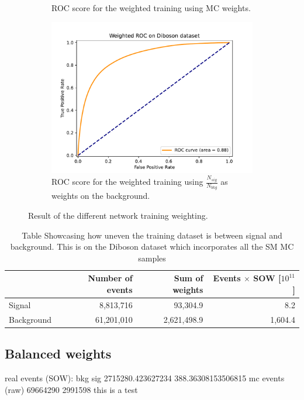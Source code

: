 \documentclass[14pt, a4paper]{book}
\begin{document}
\begin{figure}[!ht]
\begin{subfigure}[b]{0.49\textwidth}
        \caption{ROC score for the weighted training using MC weights.}\label{fig:DibosonROCMC}
     \end{subfigure}
     \begin{subfigure}[b]{0.49\textwidth}
        \centering
        \includegraphics[width=1\textwidth]{ROC_w.pdf}
        \caption{ROC score for the weighted training using $\frac{N_{sig}}{N_{bkg}}$ as weights on the background.}\label{fig:DibosonROCW}
     \end{subfigure}
	\caption{Result of the different network training weighting.}\label{fig:DibosonROC}
\end{figure}
\begin{table}[!h]
    \centering
    \begin{tabular}{l|r|r|r}\midrule\midrule
                    & Number of events & Sum of weights & Events $\times$ SOW [$10^{11}$]\\\midrule
         Signal     & 8,813,716        & 93,304.9       & 8.2\\
         Background & 61,201,010       & 2,621,498.9    & 1,604.4 \\ \midrule\midrule
    \end{tabular}
    \caption[Unbalanced Diboson training dataset]{Table Showcasing how uneven the training dataset is between signal and background. This is on the Diboson dataset which incorporates all the SM MC samples}
    \label{tab:UnbalancedDibosonTraining}
\end{table}

\subsection{Balanced weights}
real events (SOW): bkg sig 2715280.423627234 388.36308153506815 
mc events (raw) 69664290 2991598
this is a test
\clearpage
\end{document}
